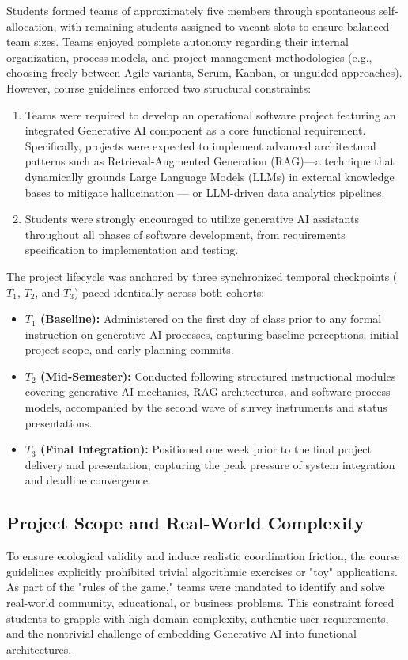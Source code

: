 \documentclass[conference]{IEEEtran}
\begin{document}
Students formed teams of approximately five members through spontaneous self-allocation, with remaining students assigned to vacant slots to ensure balanced team sizes. Teams enjoyed complete autonomy regarding their internal organization, process models, and project management methodologies (e.g., choosing freely between Agile variants, Scrum, Kanban, or unguided approaches). However, course guidelines enforced two structural constraints: 
\begin{enumerate}
    \item Teams were required to develop an operational software project featuring an integrated Generative AI component as a core functional requirement. Specifically, projects were expected to implement advanced architectural patterns such as Retrieval-Augmented Generation (RAG)---a technique that dynamically grounds Large Language Models (LLMs) in external knowledge bases to mitigate hallucination \cite{lewis2020retrieval} --- or LLM-driven data analytics pipelines.
    \item Students were strongly encouraged to utilize generative AI assistants throughout all phases of software development, from requirements specification to implementation and testing.
\end{enumerate}

The project lifecycle was anchored by three synchronized temporal checkpoints ($T_1$, $T_2$, and $T_3$) paced identically across both cohorts:
\begin{itemize}
    \item \textbf{$T_1$ (Baseline):} Administered on the first day of class prior to any formal instruction on generative AI processes, capturing baseline perceptions, initial project scope, and early planning commits.
    \item \textbf{$T_2$ (Mid-Semester):} Conducted following structured instructional modules covering generative AI mechanics, RAG architectures, and software process models, accompanied by the second wave of survey instruments and status presentations.
    \item \textbf{$T_3$ (Final Integration):} Positioned one week prior to the final project delivery and presentation, capturing the peak pressure of system integration and deadline convergence.
\end{itemize}

\subsection{Project Scope and Real-World Complexity}
To ensure ecological validity and induce realistic coordination friction, the course guidelines explicitly prohibited trivial algorithmic exercises or "toy" applications. As part of the "rules of the game," teams were mandated to identify and solve real-world community, educational, or business problems. This constraint forced students to grapple with high domain complexity, authentic user requirements, and the nontrivial challenge of embedding Generative AI into functional architectures.
\end{document}

